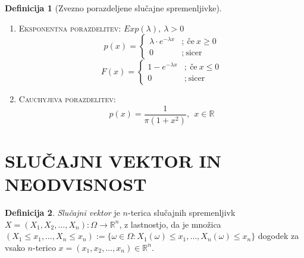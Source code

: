 \documentclass[11pt]{article}
\theoremstyle{definition}
\newtheorem{definicija}{Definicija}[section]
\theoremstyle{definition}
\theoremstyle{definition}
\begin{document}
\begin{definicija}[Zvezno porazdeljene slučajne spremenljivke]
\begin{enumerate}
	\item \textsc{Eksponentna porazdelitev}: $Exp(\lambda), ~\lambda > 0$
	$$p(x) = \begin{cases}
		\lambda \cdot e^{-\lambda x} &; ~\text{če}~ x \geq 0 \\
		0 &; ~\text{sicer}~
	\end{cases}$$
	$$F(x) = \begin{cases}
		1 - e^{-\lambda x} &; ~\text{če}~ x \leq 0 \\
		0 &; ~\text{sicer}
	\end{cases}$$
	
	\item \textsc{Cauchyjeva porazdelitev}:
	$$p(x) = \frac{1}{\pi (1 + x^2)}, ~~x \in \mathbb{R}$$
\end{enumerate}

\end{definicija}
\vspace{0.5cm}

\pagebreak


\section{SLUČAJNI VEKTOR IN NEODVISNOST}
\vspace{0.5cm}

\begin{definicija}

\textit{Slučajni vektor} je $n$-terica slučajnih spremenljivk \\$X = (X_1, X_2, \ldots, X_n): \Omega \rightarrow \mathbb{R}^n$, z lastnostjo, da je množica \\$(X_1 \leq x_1, \ldots, X_n \leq x_n) := \{ \omega \in \Omega: X_1(\omega) \leq x_1, \ldots, X_n(\omega) \leq x_n \}$ dogodek za vsako $n$-terico $x = (x_1, x_2, \ldots, x_n) \in \mathbb{R}^n$.

\end{definicija}
\vspace{0.5cm}
\end{document}
